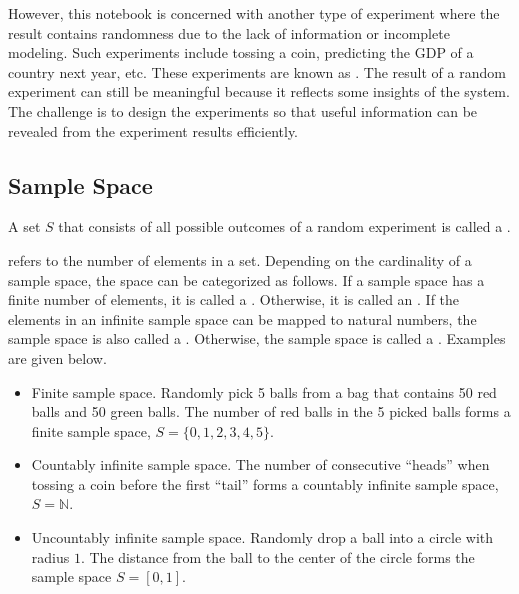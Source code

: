 However, this notebook is concerned with another type of experiment where the result contains randomness due to the lack of information or incomplete modeling. Such experiments include tossing a coin, predicting the GDP of a country next year, etc. These experiments are known as . The result of a random experiment can still be meaningful because it reflects some insights of the system. The challenge is to design the experiments so that useful information can be revealed from the experiment results efficiently.

\subsection{Sample Space}

A set $S$ that consists of all possible outcomes of a random experiment is called a .

 refers to the number of elements in a set. Depending on the cardinality of a sample space, the space can be categorized as follows. If a sample space has a finite number of elements, it is called a . Otherwise, it is called an . If the elements in an infinite sample space can be mapped to natural numbers, the sample space is also called a . Otherwise, the sample space is called a . Examples are given below.
\begin{itemize}
	\item Finite sample space. Randomly pick 5 balls from a bag that contains 50 red balls and 50 green balls. The number of red balls in the 5 picked balls forms a finite sample space, $S = \{0, 1, 2, 3, 4, 5\}$.
	\item Countably infinite sample space. The number of consecutive ``heads'' when tossing a coin before the first ``tail'' forms a countably infinite sample space, $S = \mathbb{N}$.
	\item Uncountably infinite sample space. Randomly drop a ball into a circle with radius $1$. The distance from the ball to the center of the circle forms the sample space $S=[0,1]$.
\end{itemize}

